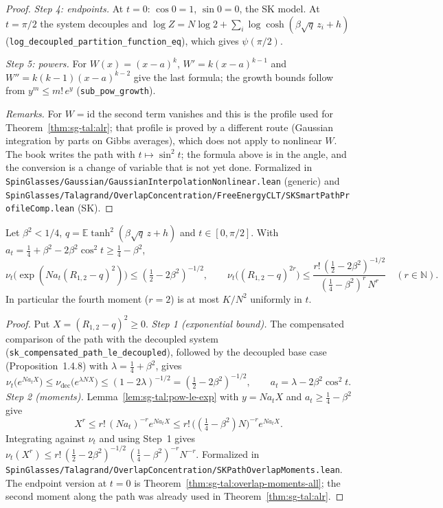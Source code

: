 \begin{proof}
\emph{Step 4: endpoints.} At $t=0$: $\cos0=1$, $\sin0=0$, the SK model. At $t=\pi/2$ the system decouples and $\log Z=N\log2+\sum_i\log\cosh(\beta\sqrt q\,z_i+h)$ (\texttt{log\_decoupled\_partition\_function\_eq}), which gives $\psi(\pi/2)$.

\emph{Step 5: powers.} For $W(x)=(x-a)^k$, $W'=k(x-a)^{k-1}$ and $W''=k(k-1)(x-a)^{k-2}$ give the last formula; the growth bounds follow from $y^m\le m!\,e^y$ (\texttt{sub\_pow\_growth}).

\emph{Remarks.} For $W=\mathrm{id}$ the second term vanishes and this is the profile used for Theorem~\ref{thm:sg-tal:alr}; that profile is proved by a different route (Gaussian integration by parts on Gibbs averages), which does not apply to nonlinear $W$. The book writes the path with $t\mapsto\sin^2t$; the formula above is in the angle, and the conversion is a change of variable that is not yet done.
Formalized in \texttt{SpinGlasses/Gaussian/GaussianInterpolationNonlinear.lean} (generic) and \texttt{SpinGlasses/Talagrand/OverlapConcentration/FreeEnergyCLT/SKSmartPathProfileComp.lean} (SK).
\end{proof}

\begin{theorem}\label{thm:sg-tal:path-overlap-moments}
  \leanok
{}
Let $\beta^2<1/4$, $q=\mathbb{E}\tanh^2(\beta\sqrt q\,z+h)$ and $t\in[0,\pi/2]$. With $a_t=\frac14+\beta^2-2\beta^2\cos^2t\ge\frac14-\beta^2$,
\[
\nu_t\big(\exp(N a_t(R_{1,2}-q)^2)\big)\le(\tfrac12-2\beta^2)^{-1/2},\qquad
\nu_t\big((R_{1,2}-q)^{2r}\big)\le \frac{r!\,(\frac12-2\beta^2)^{-1/2}}{(\frac14-\beta^2)^r\,N^r}\quad(r\in\mathbb N).
\]
In particular the fourth moment ($r=2$) is at most $K/N^2$ uniformly in $t$.
\end{theorem}
\begin{proof}
  \leanok
Put $X=(R_{1,2}-q)^2\ge0$.
\emph{Step 1 (exponential bound).} The compensated comparison of the path with the decoupled system (\texttt{sk\_compensated\_path\_le\_decoupled}), followed by the decoupled base case (Proposition~1.4.8) with $\lambda=\frac14+\beta^2$, gives
\[
\nu_t\big(e^{Na_tX}\big)\le\nu_{\mathrm{dec}}\big(e^{\lambda NX}\big)\le(1-2\lambda)^{-1/2}=(\tfrac12-2\beta^2)^{-1/2},\qquad a_t=\lambda-2\beta^2\cos^2t .
\]
\emph{Step 2 (moments).} Lemma~\ref{lem:sg-tal:pow-le-exp} with $y=Na_tX$ and $a_t\ge\frac14-\beta^2$ give
\[
X^r\le r!\,(Na_t)^{-r}e^{Na_tX}\le r!\,\big((\tfrac14-\beta^2)N\big)^{-r}e^{Na_tX}.
\]
Integrating against $\nu_t$ and using Step~1 gives $\nu_t(X^r)\le r!\,(\frac12-2\beta^2)^{-1/2}\,(\frac14-\beta^2)^{-r}N^{-r}$.
Formalized in \texttt{SpinGlasses/Talagrand/OverlapConcentration/SKPathOverlapMoments.lean}. The endpoint version at $t=0$ is Theorem~\ref{thm:sg-tal:overlap-moments-all}; the second moment along the path was already used in Theorem~\ref{thm:sg-tal:alr}.
\end{proof}

